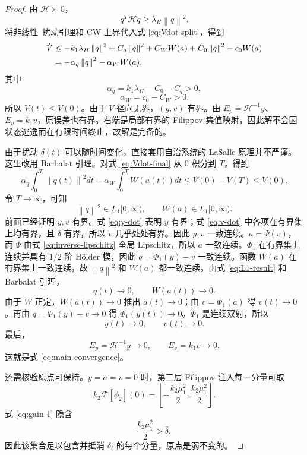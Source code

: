 \documentclass[UTF8,a4paper,12pt]{ctexart}
\newcommand{\norm}[1]{\left\lVert #1\right\rVert}
\newcommand{\cH}{\mathcal H}
\begin{document}
\begin{proof}
由 $\cH\succ0$，
\begin{equation}
 q^T\cH q\ge\lambda_H\norm q^2.
\end{equation}
将非线性--扰动引理和 CW 上界代入式 \eqref{eq:Vdot-split}，得到
\begin{align}
 \dot V
 &\le-k_1\lambda_H\norm q^2
 +C_q\norm q^2+C_WW(a)
 +C_0\norm q^2-c_0W(a)\notag\\
 &=-\alpha_q\norm q^2-\alpha_WW(a),
\label{eq:Vdot-final}
\end{align}
其中
\begin{equation}
 \alpha_q=k_1\lambda_H-C_0-C_q>0,
\end{equation}
\begin{equation}
 \alpha_W=c_0-C_W>0.
\end{equation}
所以 $V(t)\le V(0)$。由于 $V$ 径向无界，$(y,v)$ 有界。由
$E_p=\cH^{-1}y$、$E_v=k_1v$，原误差也有界。右端是局部有界的 Filippov 集值映射，因此解不会因状态逃逸而在有限时间终止，故解是完备的。

由于扰动 $\delta(t)$ 可以随时间变化，直接套用自治系统的 LaSalle 原理并不严谨。这里改用 Barbalat 引理。对式 \eqref{eq:Vdot-final} 从 $0$ 积分到 $T$，得到
\begin{equation}
 \alpha_q\int_0^T\norm{q(t)}^2dt
 +\alpha_W\int_0^T W(a(t))dt
 \le V(0)-V(T)\le V(0).
\end{equation}
令 $T\to\infty$，可知
\begin{equation}
 \norm q^2\in L_1[0,\infty),\qquad W(a)\in L_1[0,\infty).
\label{eq:L1-result}
\end{equation}
前面已经证明 $y,v$ 有界。式 \eqref{eq:y-dot} 表明 $\dot y$ 有界；式 \eqref{eq:v-dot} 中各项在有界集上均有界，且 $\delta$ 有界，所以 $\dot v$ 几乎处处有界。因此 $y,v$ 一致连续。$a=\Psi(v)$，而 $\Psi$ 由式 \eqref{eq:inverse-lipschitz} 全局 Lipschitz，所以 $a$ 一致连续。$\Phi_1$ 在有界集上连续并具有 $1/2$ 阶 H\"older 模，因此 $q=\Phi_1(y)-v$ 一致连续。函数 $W(a)$ 在有界集上一致连续，故 $\norm q^2$ 和 $W(a)$ 都一致连续。由式 \eqref{eq:L1-result} 和 Barbalat 引理，
\begin{equation}
 q(t)\to0,\qquad W(a(t))\to0.
\end{equation}
由于 $W$ 正定，$W(a(t))\to0$ 推出 $a(t)\to0$；由 $v=\Phi_1(a)$ 得 $v(t)\to0$。再由 $q=\Phi_1(y)-v\to0$ 得 $\Phi_1(y(t))\to0$。$\Phi_1$ 是连续双射，所以
\begin{equation}
 y(t)\to0,\qquad v(t)\to0.
\end{equation}
最后，
\begin{equation}
 E_p=\cH^{-1}y\to0,\qquad E_v=k_1v\to0.
\end{equation}
这就是式 \eqref{eq:main-convergence}。

还需核验原点可保持。$y=a=v=0$ 时，第二层 Filippov 注入每一分量可取
\begin{equation}
 k_2\mathcal F[\phi_2](0)
 =\left[-\frac{k_2\mu_1^2}{2},\frac{k_2\mu_1^2}{2}\right].
\end{equation}
式 \eqref{eq:gain-1} 隐含
\begin{equation}
 \frac{k_2\mu_1^2}{2}>\bar\delta,
\end{equation}
因此该集合足以包含并抵消 $\delta_i$ 的每个分量，原点是弱不变的。
\end{proof}
\end{document}
